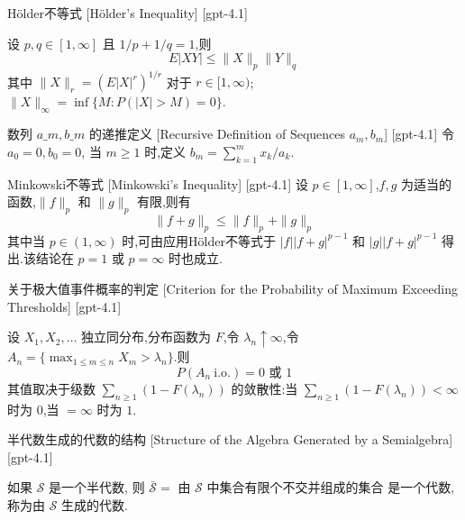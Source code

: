 \documentclass[UTF8]{ctexart}
\begin{document}
    
    
    \begin{thm}
        {Hölder不等式}
        [Hölder's Inequality]
        [gpt-4.1]
        
设 $p, q \in [1, \infty]$ 且 $1/p + 1/q = 1$,则
\[
E|XY| \leq \|X\|_p \|Y\|_q
\]
其中 $\|X\|_r = (E|X|^r)^{1/r}$ 对于 $r \in [1, \infty)$;$\|X\|_\infty = \operatorname{inf}\{M : P(|X| > M) = 0\}$.

    \end{thm}
    
    
    
    \begin{dfn}
        {数列 $a\_{m}, b\_{m}$ 的递推定义}
        [Recursive Definition of Sequences $a_{m}, b_{m}$]
        [gpt-4.1]
        令 $a_{0} = 0, b_{0} = 0$, 当 $m \geq 1$ 时,定义 $b_{m} = \sum_{k=1}^{m} x_{k} / a_{k}$.
    \end{dfn}
    
    
    
    \begin{thm}
        {Minkowski不等式}
        [Minkowski's Inequality]
        [gpt-4.1]
        设 $p \in [1, \infty]$,$f, g$ 为适当的函数,$\|f\|_p$ 和 $\|g\|_p$ 有限,则有
\[
\| f + g \|_{p} \leq \| f \|_{p} + \| g \|_{p}
\]
其中当 $p \in (1, \infty)$ 时,可由应用Hölder不等式于 $|f| |f + g|^{p-1}$ 和 $|g| |f + g|^{p-1}$ 得出.该结论在 $p = 1$ 或 $p = \infty$ 时也成立.
    \end{thm}
    
    
    
    \begin{thm}
        {关于极大值事件概率的判定}
        [Criterion for the Probability of Maximum Exceeding Thresholds]
        [gpt-4.1]
        
设 $X_1, X_2, \dots$ 独立同分布,分布函数为 $F$,令 $\lambda_n \uparrow \infty$,令 $A_n = \{\max_{1 \leq m \leq n} X_m > \lambda_n\}$.则
\[
P(A_n \ \text{i.o.}) = 0 \text{ 或 } 1
\]
其值取决于级数 $\sum_{n \geq 1} (1 - F(\lambda_n))$ 的敛散性:当 $\sum_{n \geq 1} (1 - F(\lambda_n)) < \infty$ 时为 $0$,当 $= \infty$ 时为 $1$.

    \end{thm}
    
    
    
    \begin{lma}
        {半代数生成的代数的结构}
        [Structure of the Algebra Generated by a Semialgebra]
        [gpt-4.1]
        
如果 $\mathcal{S}$ 是一个半代数, 则 $\bar{\mathcal{S}} =$ {由 $\mathcal{S}$ 中集合有限个不交并组成的集合} 是一个代数,称为由 $\mathcal{S}$ 生成的代数.

    \end{lma}
    
\end{document}
